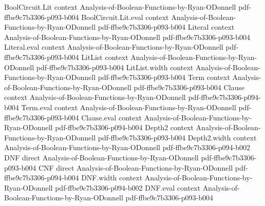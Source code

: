 \begin{lemma}
\leanok
{}
\proofstep
  {BoolCircuit.Lit}
  {context}
  {Analysis-of-Boolean-Functions-by-Ryan-ODonnell}
  {pdf-ffbe9c7b3306-p093-b004}
\proofstep
  {BoolCircuit.Lit.eval}
  {context}
  {Analysis-of-Boolean-Functions-by-Ryan-ODonnell}
  {pdf-ffbe9c7b3306-p093-b004}
\proofstep
  {Literal}
  {context}
  {Analysis-of-Boolean-Functions-by-Ryan-ODonnell}
  {pdf-ffbe9c7b3306-p093-b004}
\proofstep
  {Literal.eval}
  {context}
  {Analysis-of-Boolean-Functions-by-Ryan-ODonnell}
  {pdf-ffbe9c7b3306-p093-b004}
\proofstep
  {LitList}
  {context}
  {Analysis-of-Boolean-Functions-by-Ryan-ODonnell}
  {pdf-ffbe9c7b3306-p093-b004}
\proofstep
  {LitList.width}
  {context}
  {Analysis-of-Boolean-Functions-by-Ryan-ODonnell}
  {pdf-ffbe9c7b3306-p093-b004}
\proofstep
  {Term}
  {context}
  {Analysis-of-Boolean-Functions-by-Ryan-ODonnell}
  {pdf-ffbe9c7b3306-p093-b004}
\proofstep
  {Clause}
  {context}
  {Analysis-of-Boolean-Functions-by-Ryan-ODonnell}
  {pdf-ffbe9c7b3306-p094-b004}
\proofstep
  {Term.eval}
  {context}
  {Analysis-of-Boolean-Functions-by-Ryan-ODonnell}
  {pdf-ffbe9c7b3306-p093-b004}
\proofstep
  {Clause.eval}
  {context}
  {Analysis-of-Boolean-Functions-by-Ryan-ODonnell}
  {pdf-ffbe9c7b3306-p094-b004}
\proofstep
  {Depth2}
  {context}
  {Analysis-of-Boolean-Functions-by-Ryan-ODonnell}
  {pdf-ffbe9c7b3306-p093-b004}
\proofstep
  {Depth2.width}
  {context}
  {Analysis-of-Boolean-Functions-by-Ryan-ODonnell}
  {pdf-ffbe9c7b3306-p094-b002}
\proofstep
  {DNF}
  {direct}
  {Analysis-of-Boolean-Functions-by-Ryan-ODonnell}
  {pdf-ffbe9c7b3306-p093-b004}
\proofstep
  {CNF}
  {direct}
  {Analysis-of-Boolean-Functions-by-Ryan-ODonnell}
  {pdf-ffbe9c7b3306-p094-b004}
\proofstep
  {DNF.width}
  {context}
  {Analysis-of-Boolean-Functions-by-Ryan-ODonnell}
  {pdf-ffbe9c7b3306-p094-b002}
\proofstep
  {DNF.eval}
  {context}
  {Analysis-of-Boolean-Functions-by-Ryan-ODonnell}
  {pdf-ffbe9c7b3306-p093-b004}

\end{lemma}
